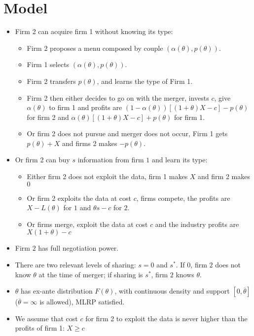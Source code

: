 \documentclass[a4paper]{article}
\renewcommand{\t}{\theta}
\renewcommand{\a}{\alpha}
\begin{document}
\section{Model}
\begin{itemize}
    \item Firm 2 can acquire firm 1 without knowing its type:
    \begin{itemize}
        \item Firm 2 proposes a menu composed by couple $(\a(\t),p(\t))$. 
        \item Firm 1 selects $(\a(\t),p(\t))$.
        \item Firm 2 transfers $p(\t)$, and learns the type of Firm 1.
        \item Firm 2 then either decides to go on with the merger, invests $c$, give $\a(\t)$ to firm 1 and profits are $(1-\a(\t))[(1+\t)X-c]-p(\t)$ for firm 2 and $\a(\t)[(1+\t)X-c]+p(\t)$ for firm 1.
        \item Or firm 2 does not pursue and merger does not occur, Firm 1 gets $p(\t)+X$ and firms 2 makes $-p(\t)$.
    \end{itemize}   
  \item Or firm 2 can buy $s$ information from firm $1$ and learn its type:
  \begin{itemize}
      \item Either firm 2 does not exploit the data, firm 1 makes $X$ and firm 2 makes $0$
      \item Or firm 2 exploits the data at cost $c$, firms compete, the profits are $X-L(\t)$ for $1$ and $\t s-c$ for $2$.
      \item Or firms merge, exploit the data at cost $c$ and the industry profits are $X(1+\t)-c$
  \end{itemize}
  \item Firm $2$ has full negotiation power.
  \item There are two relevant levels of sharing: $s=0$ and $s^*$. If $0$, firm $2$ does not know $\t$ at the time of merger; if sharing is $s^*$, firm $2$ knows $\t$.
  \item $\t$ has ex-ante distribution $F(\t)$, with continuous density and support $[0,\overline \t]$ ($\overline \t=\infty$ is allowed), MLRP satisfied.
  \item We assume that cost $c$ for firm 2 to exploit the data is never higher than the profits of firm 1: $X\geq c$
\end{itemize}
\end{document}
